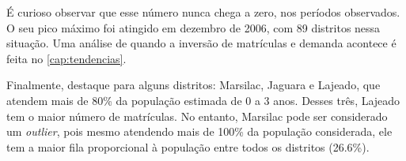 É curioso observar que esse número nunca chega a zero, nos períodos observados. O seu pico máximo foi atingido em dezembro de 2006, com 89 distritos nessa situação. Uma análise de quando a inversão de matrículas e demanda acontece é feita no \autoref{cap:tendencias}.

Finalmente, destaque para alguns distritos: Marsilac, Jaguara e Lajeado, que atendem mais de 80\% da população estimada de 0 a 3 anos. Desses três, Lajeado tem o maior número de matrículas. No entanto, Marsilac pode ser considerado um \textit{outlier}, pois mesmo atendendo mais de 100\% da população considerada, ele tem a maior fila proporcional à população entre todos os distritos (26.6\%).

